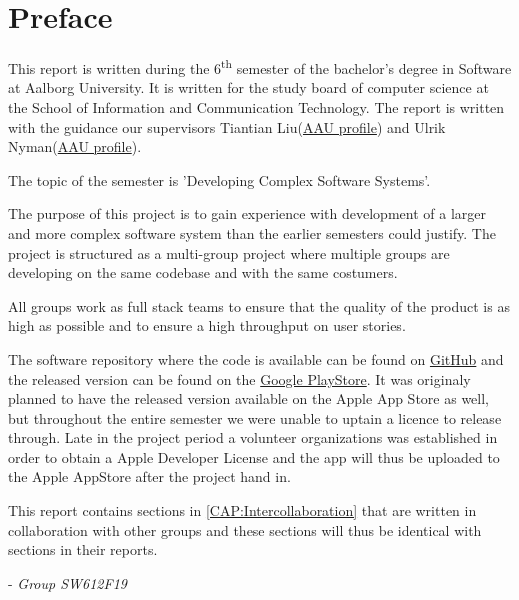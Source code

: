 \chapter*{Preface}
This report is written during the 6\textsuperscript{th} semester of the bachelor's degree in Software at Aalborg University.
It is written for the study board of computer science at the School of Information and Communication Technology.
The report is written with the guidance our supervisors Tiantian Liu(\href{http://personprofil.aau.dk/profil/145323}{AAU profile}) and Ulrik Nyman(\href{http://personprofil.aau.dk/profil/110550}{AAU profile}).

The topic of the semester is 'Developing Complex Software Systems'.

The purpose of this project is to gain experience with development of a larger and more complex software system than the earlier semesters could justify.
The project is structured as a multi-group project where multiple groups are developing on the same codebase and with the same costumers.

All groups work as full stack teams to ensure that the quality of the product is as high as possible and to ensure a high throughput on user stories.

The software repository where the code is available can be found on \href{https://github.com/aau-giraf/}{GitHub} and the released version can be found on the \href{https://play.google.com/store/apps/details?id=dk.aau.cs.giraf.weekplanner}{Google PlayStore}.
It was originaly planned to have the released version available on the Apple App Store as well, but throughout the entire semester we were unable to uptain a licence to release through.
Late in the project period a volunteer organizations was established in order to obtain a Apple Developer License and the app will thus be uploaded to the Apple AppStore after the project hand in.

This report contains sections in \autoref{CAP:Intercollaboration} that are written in collaboration with other groups and these sections will thus be identical with sections in their reports.


- \textit{Group SW612F19}

\newpage
